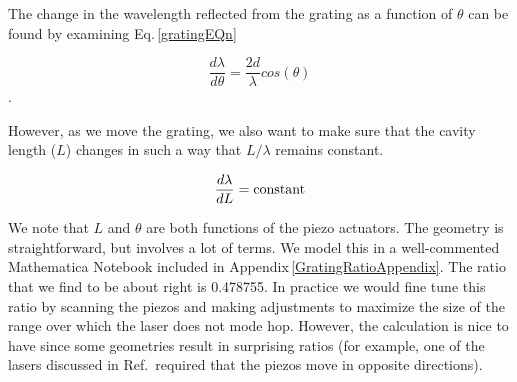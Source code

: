 The change in the wavelength reflected from the grating as a function of $\theta$ can be found by examining Eq.\,\ref{gratingEQn}

\begin{equation}
    \frac{d\lambda}{d \theta}= \frac{2d}{\lambda} cos(\theta)
\end{equation}.

However, as we move the grating, we also want to make sure that the cavity length ($L$) changes in such a way that $L/\lambda$ remains constant. 

\begin{equation}
    \frac{d \lambda}{d L}= \textnormal{constant} 
\end{equation}

We note that $L$ and $\theta$ are both functions of the piezo actuators. The geometry is straightforward, but involves a lot of terms. We model this in a well-commented Mathematica Notebook included in Appendix\,\ref{GratingRatioAppendix}. The ratio that we find to be about right is 0.478755. In practice we would fine tune this ratio by scanning the piezos and making adjustments to maximize the size of the range over which the laser does not mode hop. However, the calculation is nice to have since some geometries result in surprising ratios (for example, one of the lasers discussed in Ref.\,\cite{cjeDiss} required that the piezos move in opposite directions).


%


 





